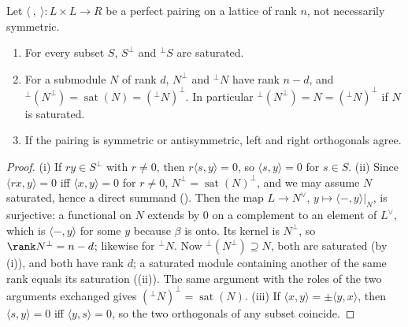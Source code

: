 \begin{proposition}[orthogonals]\label{prop:modules:orthogonal}
Let $\langle\ ,\ \rangle\colon L\times L\to R$ be a perfect pairing on a lattice of rank $n$, not necessarily symmetric.
\begin{enumerate}[label=(\roman*)]
\item For every subset $S$, $S^\perp$ and ${}^\perp S$ are saturated.
\item For a submodule $N$ of rank $d$, $N^\perp$ and ${}^\perp N$ have rank $n-d$, and ${}^\perp(N^\perp)=\operatorname{sat}(N)=({}^\perp N)^\perp$. In particular
${}^\perp(N^\perp)=N=({}^\perp N)^\perp$ if $N$ is saturated.
\item If the pairing is symmetric or antisymmetric, left and right orthogonals agree.
\end{enumerate}
\end{proposition}

\begin{proof}
(i) If $ry\in S^\perp$ with $r\ne0$, then $r\langle s,y\rangle=0$, so $\langle s,y\rangle=0$ for $s\in S$. (ii) Since $\langle rx,y\rangle=0$ iff $\langle x,y\rangle=0$ for $r\ne0$,
$N^\perp=\operatorname{sat}(N)^\perp$, and we may assume $N$ saturated, hence a direct summand (). Then the map $L\to N^\vee$,
$y\mapsto\langle-,y\rangle|_N$, is surjective: a functional on $N$ extends by $0$ on a complement to an element of $L^\vee$, which is $\langle-,y\rangle$ for some $y$ because
$\beta$ is onto. Its kernel is $N^\perp$, so $\rank N^\perp=n-d$; likewise for ${}^\perp N$. Now ${}^\perp(N^\perp)\supseteq N$, both are saturated (by (i)), and both
have rank $d$; a saturated module containing another of the same rank equals its saturation ((ii)). The
same argument with the roles of the two arguments exchanged gives $({}^\perp N)^\perp=\operatorname{sat}(N)$. (iii) If $\langle x,y\rangle=\pm\langle y,x\rangle$,
then $\langle s,y\rangle=0$ iff $\langle y,s\rangle=0$, so the two orthogonals of any subset coincide.
\end{proof}

